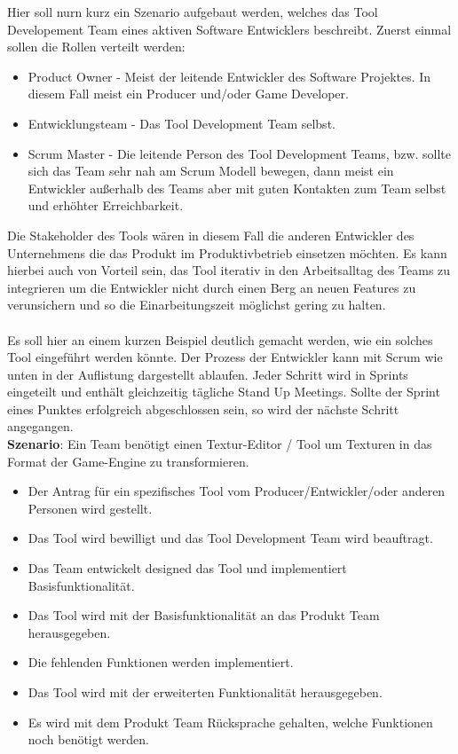 \documentclass[pagesize, paper=a4, fontsize=12pt, titlepage=true, headings=small, headnosepline, abstractoff, liststotoc, nochapterprefix, plainheadsepline, twoside]{scrreprt}
\begin{document}
Hier soll nurn kurz ein Szenario aufgebaut werden, welches das Tool Developement Team eines aktiven Software Entwicklers beschreibt. Zuerst einmal sollen die Rollen verteilt werden:

\begin{itemize}
\item Product Owner - Meist der leitende Entwickler des Software Projektes. In diesem Fall meist ein Producer und/oder Game Developer.
\item Entwicklungsteam - Das Tool Development Team selbst.
\item Scrum Master - Die leitende Person des Tool Development Teams, bzw. sollte sich das Team sehr nah am Scrum Modell bewegen, dann meist ein Entwickler außerhalb des Teams aber mit guten Kontakten zum Team selbst und erhöhter Erreichbarkeit.
\end{itemize}

Die Stakeholder des Tools wären in diesem Fall die anderen Entwickler des Unternehmens die das Produkt im Produktivbetrieb einsetzen möchten. Es kann hierbei auch von Vorteil sein, das Tool iterativ in den Arbeitsalltag des Teams zu integrieren um die Entwickler nicht durch einen Berg an neuen Features zu verunsichern und so die Einarbeitungszeit möglichst gering zu halten.
\\
\\
Es soll hier an einem kurzen Beispiel deutlich gemacht werden, wie ein solches Tool eingeführt werden könnte. Der Prozess der Entwickler kann mit Scrum wie unten in der Auflistung dargestellt ablaufen. Jeder Schritt wird in Sprints eingeteilt und enthält gleichzeitig tägliche Stand Up Meetings. Sollte der Sprint eines Punktes erfolgreich abgeschlossen sein, so wird der nächste Schritt angegangen.
\\
\textbf{Szenario}: Ein Team benötigt einen Textur-Editor / Tool um Texturen in das Format der Game-Engine zu transformieren.
\begin{itemize}
\item Der Antrag für ein spezifisches Tool vom Producer/Entwickler/oder anderen Personen wird gestellt.
\item Das Tool wird bewilligt und das Tool Development Team wird beauftragt.
\item Das Team entwickelt designed das Tool und implementiert Basisfunktionalität.
\item Das Tool wird mit der Basisfunktionalität an das Produkt Team herausgegeben.
\item Die fehlenden Funktionen werden implementiert.
\item Das Tool wird mit der erweiterten Funktionalität herausgegeben.
\item Es wird mit dem Produkt Team Rücksprache gehalten, welche Funktionen noch benötigt werden.
\end{itemize}
\end{document}
